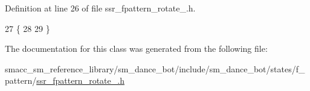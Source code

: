 Definition at line 26 of file ssr\+\_\+fpattern\+\_\+rotate\+\_.\+h.


\begin{DoxyCode}
27   \{
28     
29   \}
\end{DoxyCode}


The documentation for this class was generated from the following file\+:\begin{DoxyCompactItemize}
\item 
smacc\+\_\+sm\+\_\+reference\+\_\+library/sm\+\_\+dance\+\_\+bot/include/sm\+\_\+dance\+\_\+bot/states/f\+\_\+pattern/\hyperlink{ssr__fpattern__rotate__1_8h}{ssr\+\_\+fpattern\+\_\+rotate\+\_.\+h}\end{DoxyCompactItemize}
